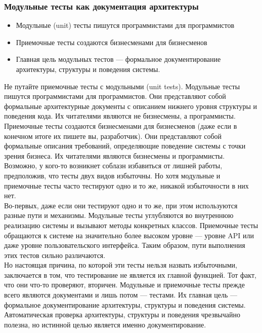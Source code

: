 \documentclass{../industrial-development}
\begin{document}
\begin{frame} \frametitle{Модульные тесты как документация архитектуры}
\begin{itemize}
  \item Модульные (unit) тесты пишутся программистами для программистов
  \item Приемочные тесты создаются бизнесменами для бизнесменов
	\item Главная цель модульных тестов — формальное документирование архитектуры, структуры и поведения системы.
\end{itemize}
\end{frame}
\lecturenotes
Не путайте приемочные тесты с модульными (unit tests). Модульные тесты пишутся программистами для программистов. Они представляют собой формальные архитектурные документы с описанием нижнего уровня структуры и поведения кода. Их читателями являются не бизнесмены, а программисты.\\
Приемочные тесты создаются бизнесменами для бизнесменов (даже если в конечном итоге их пишете вы, разработчик). Они представляют собой формальные описания требований, определяющие поведение системы с точки зрения бизнеса. Их читателями являются бизнесмены и программисты.\\
Возможно, у кого-то возникнет соблазн избавиться от лишней работы, предположив, что тесты двух видов избыточны. Но хотя модульные и приемочные тесты часто тестируют одно и то же, никакой избыточности в них нет.\\
Во-первых, даже если они тестируют одно и то же, при этом используются разные пути и механизмы. Модульные тесты углубляются во внутреннюю реализацию системы и вызывают методы конкретных классов. Приемочные тесты обращаются к системе на значительно более высоком уровне — уровне API или даже уровне пользовательского
интерфейса. Таким образом, пути выполнения этих тестов сильно различаются.\\
Но настоящая причина, по которой эти тесты нельзя назвать избыточными, заключается в том, что тестирование не является их главной функцией. Тот факт, что они что-то проверяют, вторичен. Модульные и приемочные тесты прежде всего являются документами и лишь потом — тестами. Их главная цель — формальное документирование архитектуры, структуры и поведения системы. Автоматическая проверка архитектуры, структуры и поведения чрезвычайно полезна, но истинной целью является именно документирование.
\end{document}

